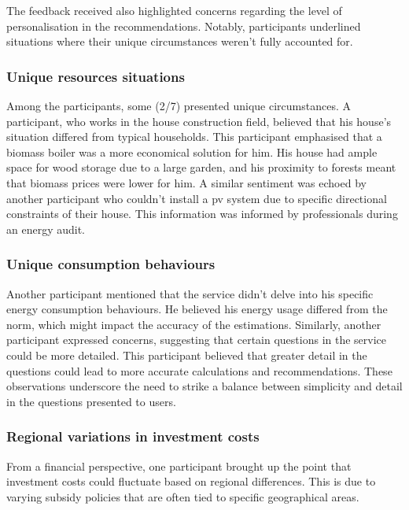 The feedback received also highlighted concerns regarding the level of personalisation in the recommendations. 
Notably, participants underlined situations where their unique circumstances weren't fully accounted for.


\subsubsection{Unique resources situations}

Among the participants, some (2/7) presented unique circumstances. 
A participant, who works in the house construction field, believed that his house's situation differed from typical households. 
This participant emphasised that a biomass boiler was a more economical solution for him.
His house had ample space for wood storage due to a large garden, and his proximity to forests meant that biomass prices were lower for him. 
A similar sentiment was echoed by another participant who couldn't install a \gls{pv} system due to specific directional constraints of their house. 
This information was informed by professionals during an energy audit.


\subsubsection{Unique consumption behaviours}

Another participant mentioned that the service didn't delve into his specific energy consumption behaviours. 
He believed his energy usage differed from the norm, which might impact the accuracy of the estimations. 
Similarly, another participant expressed concerns, suggesting that certain questions in the service could be more detailed. 
This participant believed that greater detail in the questions could lead to more accurate calculations and recommendations. 
These observations underscore the need to strike a balance between simplicity and detail in the questions presented to users. 


\subsubsection{Regional variations in investment costs}

From a financial perspective, one participant brought up the point that investment costs could fluctuate based on regional differences. 
This is due to varying subsidy policies that are often tied to specific geographical areas.



